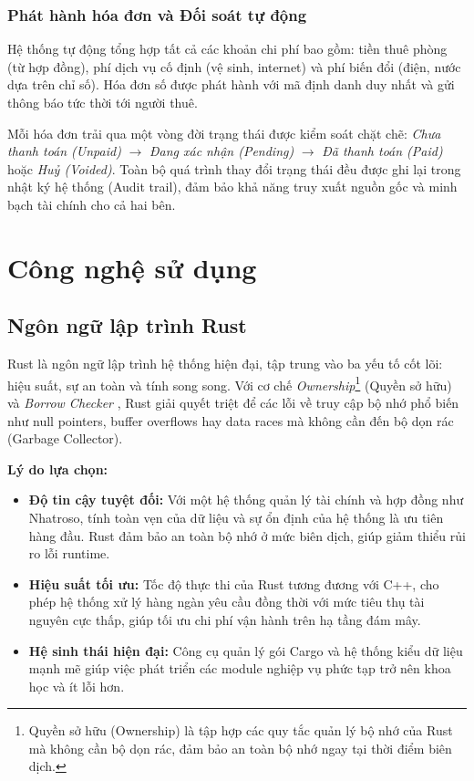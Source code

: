 \subsubsection{Phát hành hóa đơn và Đối soát tự động}
Hệ thống tự động tổng hợp tất cả các khoản chi phí bao gồm: tiền thuê phòng (từ hợp đồng), phí dịch vụ cố định (vệ sinh, internet) và phí biến đổi (điện, nước dựa trên chỉ số). Hóa đơn số được phát hành với mã định danh duy nhất và gửi thông báo tức thời tới người thuê.

Mỗi hóa đơn trải qua một vòng đời trạng thái được kiểm soát chặt chẽ: \textit{Chưa thanh toán (Unpaid)} $\rightarrow$ \textit{Đang xác nhận (Pending)} $\rightarrow$ \textit{Đã thanh toán (Paid)} hoặc \textit{Huỷ (Voided)}. Toàn bộ quá trình thay đổi trạng thái đều được ghi lại trong nhật ký hệ thống (Audit trail), đảm bảo khả năng truy xuất nguồn gốc và minh bạch tài chính cho cả hai bên.

\section{Công nghệ sử dụng}

\subsection{Ngôn ngữ lập trình Rust}
Rust là ngôn ngữ lập trình hệ thống hiện đại, tập trung vào ba yếu tố cốt lõi: hiệu suất, sự an toàn và tính song song. Với cơ chế \textit{Ownership}\footnote{Quyền sở hữu (Ownership) là tập hợp các quy tắc quản lý bộ nhớ của Rust mà không cần bộ dọn rác, đảm bảo an toàn bộ nhớ ngay tại thời điểm biên dịch.} (Quyền sở hữu) và \textit{Borrow Checker} \cite{RustBook}, Rust giải quyết triệt để các lỗi về truy cập bộ nhớ phổ biến như null pointers, buffer overflows hay data races mà không cần đến bộ dọn rác (Garbage Collector).

\textbf{Lý do lựa chọn:}
\begin{itemize}
    \item \textbf{Độ tin cậy tuyệt đối:} Với một hệ thống quản lý tài chính và hợp đồng như Nhatroso, tính toàn vẹn của dữ liệu và sự ổn định của hệ thống là ưu tiên hàng đầu. Rust đảm bảo an toàn bộ nhớ ở mức biên dịch, giúp giảm thiểu rủi ro lỗi runtime.
    \item \textbf{Hiệu suất tối ưu:} Tốc độ thực thi của Rust tương đương với C++, cho phép hệ thống xử lý hàng ngàn yêu cầu đồng thời với mức tiêu thụ tài nguyên cực thấp, giúp tối ưu chi phí vận hành trên hạ tầng đám mây.
    \item \textbf{Hệ sinh thái hiện đại:} Công cụ quản lý gói Cargo và hệ thống kiểu dữ liệu mạnh mẽ giúp việc phát triển các module nghiệp vụ phức tạp trở nên khoa học và ít lỗi hơn.
\end{itemize}


